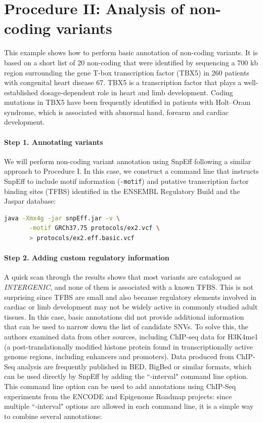 \section{Procedure II: Analysis of non-coding variants}

This example shows how to perform basic annotation of non-coding variants. It is based on a short list of 20 non-coding that were identified by sequencing a 700 kb region surrounding the gene T-box transcription factor (TBX5) in 260 patients with congenital heart disease 67. TBX5 is a transcription factor that plays a well-established dosage-dependent role in heart and limb development. Coding mutations in TBX5 have been frequently identified in patients with Holt–Oram syndrome, which is associated with abnormal hand, forearm and cardiac development.

\paragraph{Step 1. Annotating variants} We will perform non-coding variant annotation using SnpEff following a similar approach to Procedure I. In this case, we construct a command line that instructs SnpEff to include motif information (\texttt{-motif}) and putative transcription factor binding sites (TFBS) identified in the ENSEMBL Regulatory Build and the Jaspar database:

\begin{lstlisting}[language=bash]
java -Xmx4g -jar snpEff.jar -v \
       -motif GRCh37.75 protocols/ex2.vcf \
       > protocols/ex2.eff.basic.vcf
\end{lstlisting}

\paragraph{Step 2. Adding custom regulatory information} A quick scan through the results shows that most variants are catalogued as \textit{INTERGENIC}, and none of them is associated with a known TFBS. This is not surprising since TFBS are small and also because regulatory elements involved in cardiac or limb development may not be widely active in commonly studied adult tissues. In this case, basic annotations did not provide additional information that can be used to narrow down the list of candidate SNVs. To solve this, the authors examined data from other sources, including ChIP-seq data for H3K4me1 (a post-translationally modified histone protein found in transcriptionally active genome regions, including enhancers and promoters). Data produced from ChIP-Seq analysis are frequently published in BED, BigBed or similar formats, which can be used directly by SnpEff by adding the ``-interval" command line option. This command line option can be used to add annotations using ChIP-Seq experiments from the ENCODE and Epigenome Roadmap projects: since multiple ``-interval" options are allowed in each command line, it is a simple way to combine several annotations:

